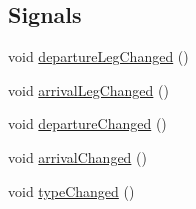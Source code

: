 \subsection*{Signals}
\begin{DoxyCompactItemize}
\item 
void \mbox{\hyperlink{classQRail_1_1RouterEngine_1_1Transfer_a119d4fc68a9f4530aed848256477bd85}{departure\+Leg\+Changed}} ()
\item 
void \mbox{\hyperlink{classQRail_1_1RouterEngine_1_1Transfer_a091453e0df3e53521e9fdb5c3f5afb01}{arrival\+Leg\+Changed}} ()
\item 
void \mbox{\hyperlink{classQRail_1_1RouterEngine_1_1Transfer_a759f8ef7d2ebc5d3377e0a3d6d22c068}{departure\+Changed}} ()
\item 
void \mbox{\hyperlink{classQRail_1_1RouterEngine_1_1Transfer_a8d8d0e3c03ff32d921f672da6a4856d4}{arrival\+Changed}} ()
\item 
void \mbox{\hyperlink{classQRail_1_1RouterEngine_1_1Transfer_a2acb2ce4b06bbc6fae9ebdc8580f36cc}{type\+Changed}} ()
\end{DoxyCompactItemize}
